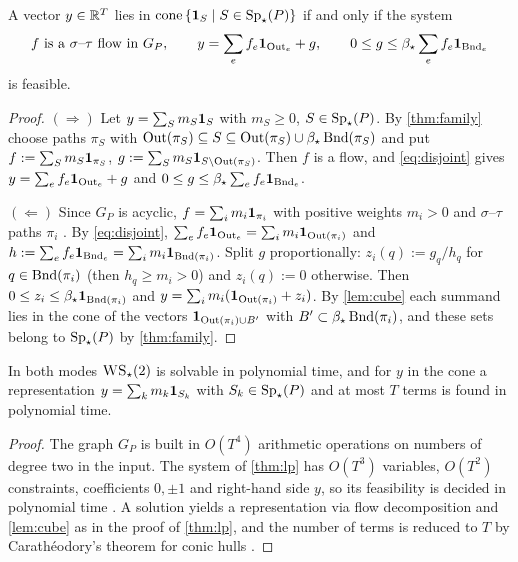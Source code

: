 \begin{theorem}[$d=2$]\label{thm:lp}
A vector $y\in\mathbb{R}^T$ lies in $\operatorname{cone}\left\{ \mathbf 1_{S}\mid S\in\operatorname{Sp}_\star(P) \right\}$ if and only if the system
\[
f\ \text{is a $\sigma$--$\tau$ flow in }G_P,\qquad y=\sum_ef_e\mathbf 1_{\operatorname{Out}_e}+g,\qquad 0\le g\le\beta_\star\sum_ef_e\mathbf 1_{\operatorname{Bnd}_e}
\]
is feasible.
\end{theorem}

\begin{proof}
$(\Rightarrow)$ Let $y=\sum_Sm_S\mathbf 1_{S}$ with $m_S\ge0$, $S\in\operatorname{Sp}_\star(P)$. By \cref{thm:family} choose paths $\pi_S$ with $\operatorname{Out}(\pi_S)\subseteq S\subseteq\operatorname{Out}(\pi_S)\cup\beta_\star\operatorname{Bnd}(\pi_S)$ and put $f:=\sum_Sm_S\mathbf 1_{\pi_S}$, $g:=\sum_Sm_S\mathbf 1_{S\setminus\operatorname{Out}(\pi_S)}$. Then $f$ is a flow, and \eqref{eq:disjoint} gives $y=\sum_ef_e\mathbf 1_{\operatorname{Out}_e}+g$ and $0\le g\le\beta_\star\sum_ef_e\mathbf 1_{\operatorname{Bnd}_e}$.

$(\Leftarrow)$ Since $G_P$ is acyclic, $f=\sum_im_i\mathbf 1_{\pi_i}$ with positive weights $m_i>0$ and $\sigma$--$\tau$ paths $\pi_i$ \citep[Thm.~3.5]{AhujaMagnantiOrlin1993}. By \eqref{eq:disjoint}, $\sum_ef_e\mathbf 1_{\operatorname{Out}_e}=\sum_im_i\mathbf 1_{\operatorname{Out}(\pi_i)}$ and $h:=\sum_ef_e\mathbf 1_{\operatorname{Bnd}_e}=\sum_im_i\mathbf 1_{\operatorname{Bnd}(\pi_i)}$. Split $g$ proportionally: $z_i(q):=g_q/h_q$ for $q\in\operatorname{Bnd}(\pi_i)$ (then $h_q\ge m_i>0$) and $z_i(q):=0$ otherwise. Then $0\le z_i\le\beta_\star\mathbf 1_{\operatorname{Bnd}(\pi_i)}$ and $y=\sum_im_i(\mathbf 1_{\operatorname{Out}(\pi_i)}+z_i)$. By \cref{lem:cube} each summand lies in the cone of the vectors $\mathbf 1_{\operatorname{Out}(\pi_i)\cup B'}$ with $B'\subset\beta_\star\operatorname{Bnd}(\pi_i)$, and these sets belong to $\operatorname{Sp}_\star(P)$ by \cref{thm:family}.
\end{proof}

\begin{corollary}[polynomiality]\label{cor:poly}
In both modes $\textsc{WS}_\star(2)$ is solvable in polynomial time, and for $y$ in the cone a representation $y=\sum_km_k\mathbf 1_{S_k}$ with $S_k\in\operatorname{Sp}_\star(P)$ and at most $T$ terms is found in polynomial time.
\end{corollary}

\begin{proof}
The graph $G_P$ is built in $O(T^4)$ arithmetic operations on numbers of degree two in the input. The system of \cref{thm:lp} has $O(T^3)$ variables, $O(T^2)$ constraints, coefficients $0,\pm1$ and right-hand side $y$, so its feasibility is decided in polynomial time \citep[Ch.~13--15]{Schrijver1986}. A solution yields a representation via flow decomposition and \cref{lem:cube} as in the proof of \cref{thm:lp}, and the number of terms is reduced to $T$ by Carath\'eodory's theorem for conic hulls \citep[Cor.~17.1.2]{Rockafellar1970}.
\end{proof}

